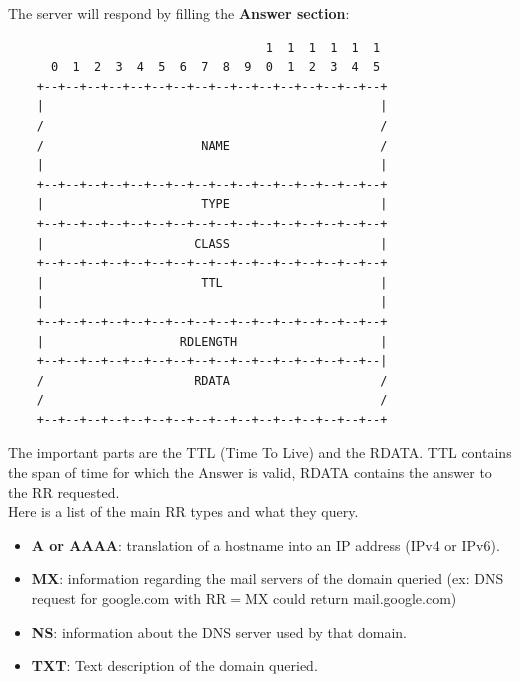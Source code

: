 \cite{dns4}
The server will respond by filling the \textbf{Answer section}: \\
\cite{dns5}
\begin{verbatim}
                                    1  1  1  1  1  1
      0  1  2  3  4  5  6  7  8  9  0  1  2  3  4  5
    +--+--+--+--+--+--+--+--+--+--+--+--+--+--+--+--+
    |                                               |
    /                                               /
    /                      NAME                     /
    |                                               |
    +--+--+--+--+--+--+--+--+--+--+--+--+--+--+--+--+
    |                      TYPE                     |
    +--+--+--+--+--+--+--+--+--+--+--+--+--+--+--+--+
    |                     CLASS                     |
    +--+--+--+--+--+--+--+--+--+--+--+--+--+--+--+--+
    |                      TTL                      |
    |                                               |
    +--+--+--+--+--+--+--+--+--+--+--+--+--+--+--+--+
    |                   RDLENGTH                    |
    +--+--+--+--+--+--+--+--+--+--+--+--+--+--+--+--|
    /                     RDATA                     /
    /                                               /
    +--+--+--+--+--+--+--+--+--+--+--+--+--+--+--+--+
\end{verbatim}

The important parts are the TTL (Time To Live) and the RDATA. TTL contains the span of time for which the Answer is valid, RDATA contains the answer to the RR requested.\\
\cite{dns6}
Here is a list of the main RR types and what they query.\\
\begin{itemize}[noitemsep]
\item \textbf{A or AAAA}: translation of a hostname into an IP address (IPv4 or IPv6).\\
\item \textbf{MX}: information regarding the mail servers of the domain queried (ex: DNS request for google.com with RR$=$MX could return mail.google.com) \\
\item \textbf{NS}: information about the DNS server used by that domain.\\
\item \textbf{TXT}: Text description of the domain queried.
\end{itemize}

